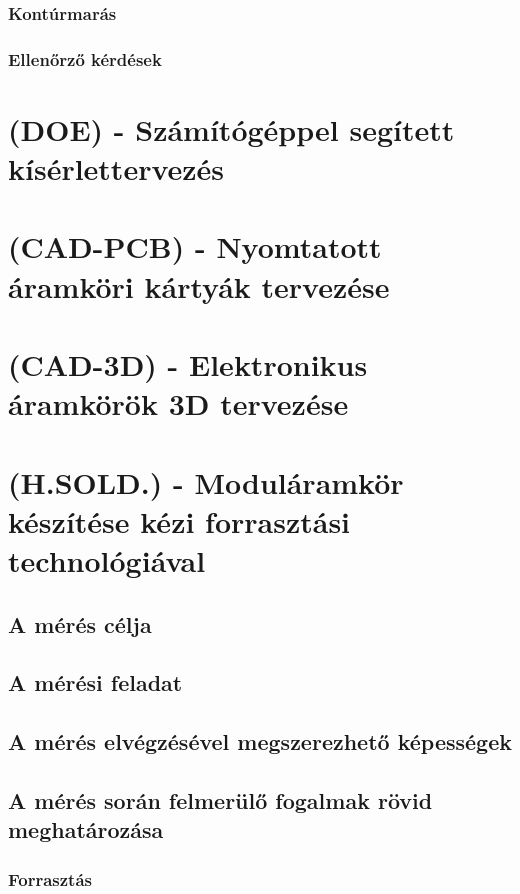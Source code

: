 \documentclass[12pt]{article}
\begin{document}
		\subsubsection{Kontúrmarás}

		\subsubsection{Ellenőrző kérdések}


	\section{(DOE) - Számítógéppel segített kísérlettervezés}
	\section{(CAD-PCB) - Nyomtatott áramköri kártyák tervezése}
	\section{(CAD-3D) - Elektronikus áramkörök 3D tervezése}
	\section{}
	\section{(H.SOLD.) - Moduláramkör készítése kézi forrasztási technológiával}

		\subsection{A mérés célja}
		
		\subsection{A mérési feladat}

		\subsection{A mérés elvégzésével megszerezhető képességek}

		\subsection{A mérés során felmerülő fogalmak rövid meghatározása}

			\subsubsection{Forrasztás}
\end{document}
